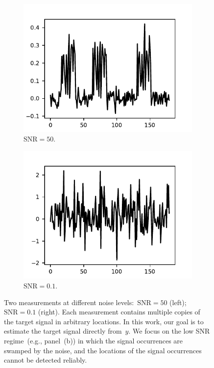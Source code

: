 \documentclass{article}
\begin{document}
\begin{figure}[!tb]
	\begin{subfigure}[ht]{0.49\columnwidth}
		\centering
		\includegraphics[width=\columnwidth]{figures/y_SNR50.pdf}
		\caption{$\text{SNR} = 50$.}
	\end{subfigure}
	\hfill
	\begin{subfigure}[ht]{0.49\columnwidth}
		\centering
		\includegraphics[width=\columnwidth]{figures/y_SNR01.pdf}
		\caption{$\text{SNR} = 0.1$.}
	\end{subfigure}
	\caption{Two measurements at different noise levels:~\mbox{$\text{SNR} = 50$} (left);~\mbox{$\text{SNR} = 0.1$} (right). Each measurement contains multiple copies of the target signal in arbitrary locations. In this work, our goal is to estimate the target signal directly from~$y$. We focus on the low SNR regime~(e.g., panel~(b)) in which the signal occurrences are swamped by the noise, and the locations of the signal occurrences cannot be detected reliably.}
\label{fig:measurements}
\end{figure}
\end{document}
